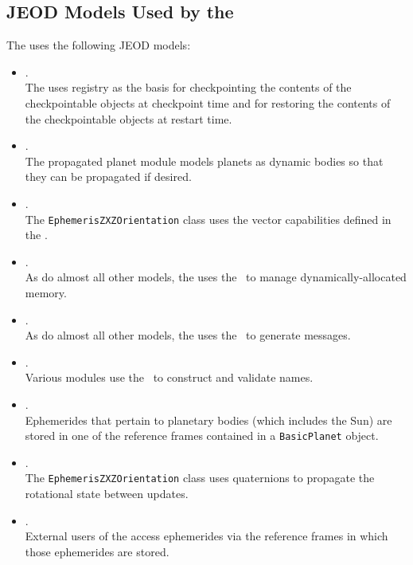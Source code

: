 \subsection{JEOD Models Used by the \ModelDesc}
The \ModelDesc uses the following JEOD models:
\begin{itemize}
\item{}.\\
The \ModelDesc uses registry as the basis for
checkpointing the contents of the checkpointable objects at checkpoint time
and for restoring the contents of the checkpointable objects at restart time.

\item{}.\\
The propagated planet module models planets as dynamic bodies
so that they can be propagated if desired.

\item{}.\\
The \texttt{EphemerisZXZOrientation} class uses the vector capabilities
defined in the \MATH.

\item{}.\\
As do almost all other models,
the \ModelDesc uses the \MESSAGE\ to manage dynamically-allocated memory.

\item{}.\\
As do almost all other models,
the \ModelDesc uses the \MESSAGE\ to generate messages.

\item{}.\\
Various modules use the \NAMEDITEM\ to construct and validate names.

\item{}.\\
Ephemerides that pertain to planetary bodies (which includes the Sun) are
stored in one of the reference frames contained in a
\texttt{BasicPlanet} object.

\item{}.\\
The \texttt{EphemerisZXZOrientation} class uses quaternions to
propagate the rotational state between updates.

\item{}.\\
External users of the \ModelDesc access ephemerides
via the reference frames in which those ephemerides are stored.


\end{itemize}
